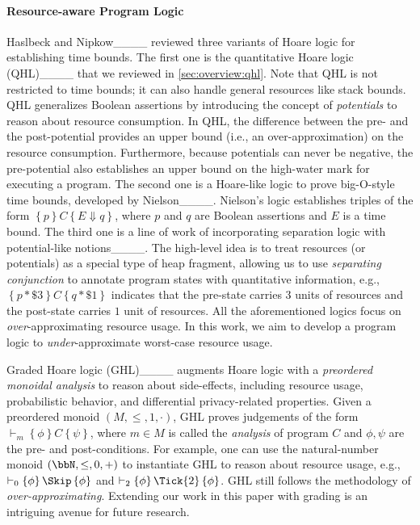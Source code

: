 \paragraph*{Resource-aware Program Logic}
%
Haslbeck and Nipkow____ reviewed three variants of Hoare logic for establishing time bounds.
%
The first one is the quantitative Hoare logic (QHL)____ that we reviewed in \cref{sec:overview:qhl}.
%
Note that QHL is not restricted to time bounds; it can also handle general resources like stack bounds.
%
QHL generalizes Boolean assertions by introducing the concept of \emph{potentials} to reason about resource consumption.
%
In QHL, the difference between the pre- and the post-potential provides an upper bound (i.e., an over-approximation) on the resource consumption.
%
Furthermore, because potentials can never be negative, the pre-potential also establishes an upper bound on the high-water mark for executing a program.
%
The second one is a Hoare-like logic to prove big-O-style time bounds, developed by Nielson____.
%
Nielson's logic establishes triples of the form $\left\{p\right\} C \left\{ E \Downarrow q \right\}$, where $p$ and $q$ are Boolean assertions and $E$ is a time bound.
%
The third one is a line of work of incorporating separation logic with potential-like notions____.
%
The high-level idea is to treat resources (or potentials) as a special type of heap fragment, allowing us to use \emph{separating conjunction} to annotate program states with quantitative information, e.g., $\left\{p \ast \$3\right\} C \left\{ q \ast \$1 \right\}$ indicates that the pre-state carries $3$ units of resources and the post-state carries $1$ unit of resources.
%
All the aforementioned logics focus on \emph{over}-approximating resource usage.
%
In this work, we aim to develop a program logic to \emph{under}-approximate worst-case resource usage.

Graded Hoare logic (GHL)____ augments Hoare logic with a \emph{preordered monoidal analysis} to reason about side-effects, including resource usage, probabilistic behavior, and differential privacy-related properties.
%
Given a preordered monoid $(M,{\le},1,{\cdot})$, GHL proves judgements of the form $\vdash_m \left\{ \phi \right\} C \left\{ \psi \right\}$, where $m \in M$ is called the \emph{analysis} of program $C$ and $\phi,\psi$ are the pre- and post-conditions.
%
For example, one can use the natural-number monoid $(\bbN,{\le},0,{+})$ to instantiate GHL to reason about resource usage, e.g., $\vdash_0 \left\{\phi\right\} \Skip \left\{\phi\right\}$ and $\vdash_2 \left\{\phi\right\} \Tick{2} \left\{\phi\right\}$.
%
GHL still follows the methodology of \emph{over-approximating}.
%
Extending our work in this paper with grading is an intriguing avenue for future research.

